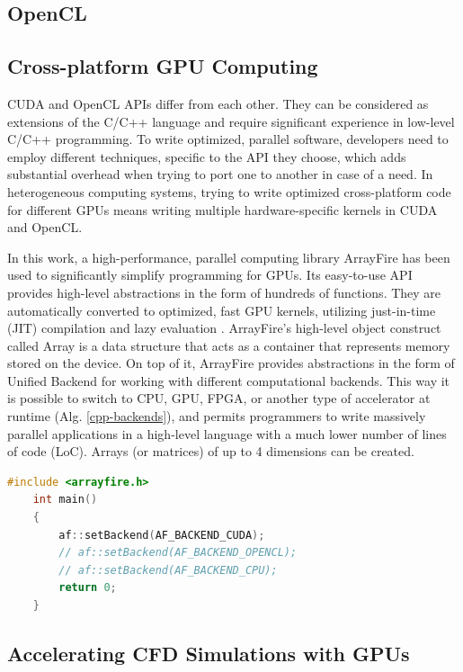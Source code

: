 \subsection{OpenCL}

\subsection{Cross-platform GPU Computing}
\label{sec:computer-simulations-using-gpus}

CUDA and OpenCL APIs differ from each other. They can be considered as extensions of the C/C++ language and require significant experience in low-level C/C++ programming. To write optimized, parallel software, developers need to employ different techniques, specific to the API they choose, which adds substantial overhead when trying to port one to another in case of a need. In heterogeneous computing systems, trying to write optimized cross-platform code for different GPUs means writing multiple hardware-specific kernels in CUDA and OpenCL.

In this work, a high-performance, parallel computing library ArrayFire has been used to significantly simplify programming for GPUs. Its easy-to-use API provides high-level abstractions in the form of hundreds of functions. They are automatically converted to optimized, fast GPU kernels, utilizing just-in-time (JIT) compilation and lazy evaluation \cite{chrzeszczykMatrixComputationsGPU}. ArrayFire's high-level object construct called Array is a data structure that acts as a container that represents memory stored on the device. On top of it, ArrayFire provides abstractions in the form of Unified Backend for working with different computational backends. This way it is possible to switch to CPU, GPU, FPGA, or another type of accelerator at runtime \cite{Yalamanchili2015} (Alg. \ref{cpp-backends}), and permits programmers to write massively parallel applications in a high-level language with a much lower number of lines of code (LoC). Arrays (or matrices) of up to 4 dimensions can be created. 

\begin{lstlisting}[language=Cpp, caption=C++ code for setting different computing backends., label=cpp-backends]
	#include <arrayfire.h>
	int main()
	{
		af::setBackend(AF_BACKEND_CUDA);
		// af::setBackend(AF_BACKEND_OPENCL);
		// af::setBackend(AF_BACKEND_CPU);
		return 0;
	}
\end{lstlisting}

\subsection{Accelerating CFD Simulations with GPUs}

